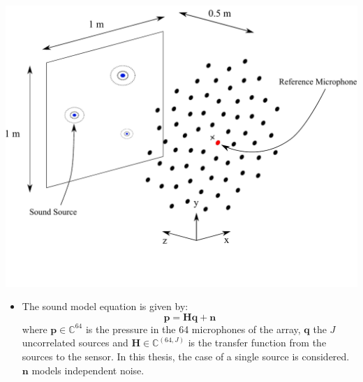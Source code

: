 \documentclass[12pt,pdftex,16x10]{elpres} %
\begin{document}
\begin{psli}
  \begin{minipage}[b][0.7\textheight][t]{0.5\textwidth}
    \centering
    \includegraphics[width=1.1\textwidth]{figs/full_measurement_setup.pdf}
  \end{minipage}
  \begin{minipage}[b][0.7\textheight][t]{0.5\textwidth}
    \begin{itemize}
      \item  The sound model equation is given by:
    \begin{equation}
        \mathbf{p} = \mathbf{H} \mathbf{q} + \mathbf{n}
    \end{equation}
    where $\mathbf{p} \in \mathbb{C}^{64}$ is the pressure in the 64 microphones of the array, $\mathbf{q}$ the $J$ uncorrelated sources and $\mathbf{H} \in \mathbb{C}^{(64,J)}$ is the transfer function from the sources to the sensor. In this thesis, the case of a single source is considered. $\mathbf{n}$ models independent noise.
    \end{itemize}
  \end{minipage}
  
\end{psli}
\end{document}
